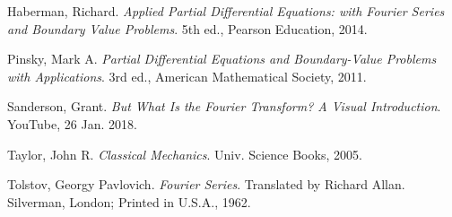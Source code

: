 \documentclass[12pt,letterpaper]{article}
\begin{document}
\begin{thebibliography}{9}


Haberman, Richard. \textit{Applied Partial Differential Equations: with Fourier Series and Boundary Value Problems}. 5th ed., Pearson Education, 2014.

Pinsky, Mark A. \textit{Partial Differential Equations and Boundary-Value Problems with Applications}. 3rd ed., American Mathematical Society, 2011.

Sanderson, Grant. \textit{But What Is the Fourier Transform? A Visual Introduction}. YouTube, 26 Jan. 2018.

Taylor, John R. \textit{Classical Mechanics}. Univ. Science Books, 2005.

Tolstov, Georgy Pavlovich. \textit{Fourier Series}. Translated by Richard Allan. Silverman, London; Printed in U.S.A., 1962.

\end{thebibliography}

\end{document}
